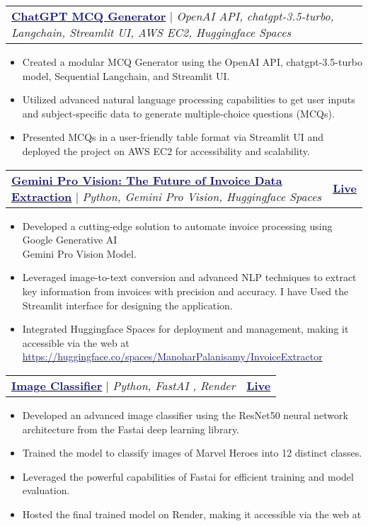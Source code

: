 \documentclass[letterpaper,11pt]{article}
\makeatletter
\newcommand{\resumeItem}[1]{
  \item\small{
    {#1 \vspace{-2pt}}
  }
}
\newcommand{\resumeProjectHeading}[2]{
    \item
    \begin{tabular*}{1.001\textwidth}{l@{\extracolsep{\fill}}r}
      \small#1 & \textbf{\small #2}\\
    \end{tabular*}\vspace{-7pt}
}
\newcommand{\resumeItemListStart}{\begin{itemize}}
\newcommand{\resumeItemListEnd}{\end{itemize}\vspace{-5pt}}
\makeatother
\begin{document}
         \resumeProjectHeading
         {\textbf{\href{https://github.com/send2manoo/ChatGPT-MCQ-Generator}{\textcolor{MidnightBlue}{ChatGPT MCQ Generator}}} $|$ \emph{OpenAI API, chatgpt-3.5-turbo, Langchain, Streamlit UI, AWS EC2, Huggingface Spaces}}{}
         \resumeItemListStart
             \resumeItem{Created a modular MCQ Generator using the OpenAI API, chatgpt-3.5-turbo model, Sequential Langchain, and Streamlit UI.}
             \resumeItem{Utilized advanced natural language processing capabilities to get user inputs and subject-specific data to generate multiple-choice questions (MCQs).}
             \resumeItem{Presented MCQs in a user-friendly table format via Streamlit UI and deployed the project on AWS EC2 for accessibility and scalability.}
         \resumeItemListEnd
         \vspace{-13pt}

         \resumeProjectHeading
        {\textbf{\href{https://huggingface.co/spaces/ManoharPalanisamy/InvoiceExtractor}{\textcolor{MidnightBlue}{Gemini Pro Vision: The Future of Invoice Data Extraction}}} $|$ \emph{Python, Gemini Pro Vision, Huggingface Spaces}} {\href{https://huggingface.co/spaces/ManoharPalanisamy/InvoiceExtractor}{\textcolor{MidnightBlue}{Live}}}
        \resumeItemListStart
          \resumeItem{Developed a cutting-edge solution to automate invoice processing using Google Generative AI \\ Gemini Pro Vision Model.}
          \resumeItem{Leveraged image-to-text conversion and advanced NLP techniques to extract key information from invoices with precision and accuracy. I have Used the Streamlit interface for designing the application.}
          \resumeItem{Integrated Huggingface Spaces for deployment and management, making it accessible via the web at {\href{https://huggingface.co/spaces/ManoharPalanisamy/InvoiceExtractor}{\textcolor{MidnightBlue}{https://huggingface.co/spaces/ManoharPalanisamy/InvoiceExtractor}}}}
         \resumeItemListEnd
         \vspace{-13pt}

     
      \resumeProjectHeading
      {\textbf{\href{http://project.decodeai.in}{\textcolor{MidnightBlue}{Image Classifier}}} $|$ \emph{Python, FastAI , Render}} {\href{http://project.decodeai.in}{\textcolor{MidnightBlue}{Live}}}
          \resumeItemListStart
            \resumeItem{Developed an advanced image classifier using the ResNet50 neural network architecture from the Fastai deep learning library.}
            \resumeItem{Trained the model to classify images of Marvel Heroes into 12 distinct classes.}
            \resumeItem{Leveraged the powerful capabilities of Fastai for efficient training and model evaluation.}
           \resumeItem{Hosted the final trained model on Render, making it accessible via the web at  \href{http://project.decodeai.in}{\color{MidnightBlue}{https://project.decodeai.in}}}
           \resumeItemListEnd
          
\end{document}
